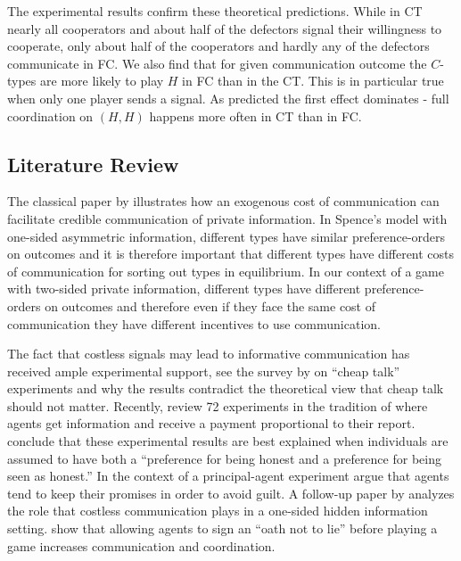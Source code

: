 \documentclass[12pt]{article}
\theoremstyle{break}
\begin{document}
The experimental results confirm these theoretical predictions. While in CT nearly all cooperators and about half of the defectors signal their willingness to cooperate, only about half of the cooperators and hardly any of the defectors communicate in FC. We also find that for given communication outcome the $C$-types are more likely to play $H$ in FC than in the CT. This is in particular true when only one player sends a signal. As predicted the first effect dominates - full coordination on $(H,H)$ happens more often in CT than in FC.

 \subsection*{Literature Review}
The classical paper by \cite{Spence1973} illustrates how an exogenous cost of communication can facilitate credible communication of private information. In Spence's model with one-sided asymmetric information, different types have similar preference-orders on outcomes and it is therefore important that different types have different costs of communication for sorting out types in equilibrium. In our context of a game with two-sided private information, different types have different preference-orders on outcomes and therefore even if they face the same cost of communication they have different incentives to use communication.


The fact that costless signals may lead to informative communication has received ample experimental support, see the survey by \cite{crawford1998} on ``cheap talk'' experiments and why the results contradict the theoretical view that cheap talk should not matter. Recently, \cite{abeler2019} review 72 experiments in the tradition of \cite{fischbacher2013} where agents get information and receive a payment proportional to their report. \cite{abeler2019} conclude that these experimental results are  best explained when individuals are assumed to have both a ``preference for being honest and a preference for being seen as honest.'' In the context of a principal-agent experiment \cite{charness2006} argue that agents tend to keep their promises in order to avoid guilt. A follow-up paper by \cite{charness2011} analyzes the role that costless communication plays in a one-sided hidden information setting. \cite{jacquemet2018} show that allowing agents to sign an ``oath not to lie'' before playing a game increases communication and coordination.
\end{document}
